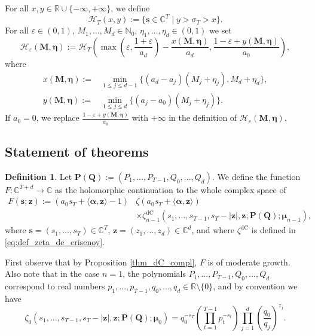 \documentclass[a4paper,12pt]{article}
\theoremstyle{definition}
\newtheorem{definition}[thm]{Definition}
\numberwithin{equation}{section}
\newcommand{\dc}{\mathrm{dC}}
\begin{document}
For all $x,y \in \mathbb{R}\cup \{ -\infty,+\infty \}$, we define
$$ \mathcal{H}_T(x,y):= \{ \mathbf{s} \in \mathbb{C}^T \mid y>\sigma_T>x \}. $$
For all $\varepsilon \in (0,1)$, $M_1,\ldots,M_d \in \mathbb{N}_0$, $\eta_1,\ldots,\eta_d \in (0,1)$ we set
$$ \mathcal{H}_{\varepsilon}(\mathbf{M},\boldsymbol{\eta}) := \mathcal{H}_T\left(\max\left(\varepsilon,\frac{1+\varepsilon}{a_d}\right)-\frac{x(\mathbf{M},\boldsymbol{\eta})}{a_d},\frac{1-\varepsilon+y(\mathbf{M},\boldsymbol{\eta})}{a_0}\right), $$
where 
\begin{align*}
    x(\mathbf{M},\boldsymbol{\eta}):=&\min_{1 \leq j \leq d-1}\{(a_d-a_j)(M_j+\eta_j),M_d+\eta_d\}, \\
    y(\mathbf{M},\boldsymbol{\eta}):=&\min_{1 \leq j \leq d}\{(a_j-a_0)(M_j+\eta_j)\}.
\end{align*}
If $a_0=0$, we replace $\frac{1-\varepsilon+y(\mathbf{M},\boldsymbol{\eta})}{a_0}$ with $+\infty$ in the definition of $\mathcal{H}_{\varepsilon}(\mathbf{M},\boldsymbol{\eta})$.

\subsection{Statement of theorems}

\begin{definition}
\label{def:F}
Let $\mathbf{P(Q)}:=(P_1,\ldots,P_{T-1},Q_0,\ldots, Q_d)$. We define the function $F:\mathbb{C}^{T+d} \to \mathbb{C}$ as the holomorphic continuation to the whole complex space of
\begin{align*}
    F(\mathbf{s};\mathbf{z}):= (a_0s_T+\langle \boldsymbol{\alpha},\mathbf{z} \rangle-1) &\zeta(a_0s_T+\langle \boldsymbol{\alpha},\mathbf{z} \rangle) \\
    & \times \zeta_{n-1}^{\dc}\left(s_1,\ldots,s_{T-1},s_T-|\mathbf{z}|,\mathbf{z}; \mathbf{P(Q)};\boldsymbol{\mu}_{n-1}\right),
\end{align*}
where $\mathbf{s}=(s_1,\ldots,s_T) \in \mathbb{C}^T$, $\mathbf{z}=(z_1,\ldots,z_d) \in \mathbb{C}^d$, and where $\zeta^{\dc}$ is defined in \eqref{eq:def_zeta_de_crisenoy}.
\end{definition}

First observe that by Proposition \ref{thm_dC_compl}, $F$ is of moderate growth. Also note that in the case $n=1$, the polynomials $P_1,\ldots,P_{T-1},Q_0,\ldots, Q_d$ correspond to real numbers $p_1,\ldots,p_{T-1},q_0,\ldots,q_d \in \mathbb{R} \setminus\{0\}$, and by convention we have
$$ \zeta_{0}(s_1,\ldots,s_{T-1},s_T-|\mathbf{z}|,\mathbf{z}; \mathbf{P(Q)};\boldsymbol{\mu}_0)=q_0^{-s_T} \left(\prod_{t=1}^{T-1} p_t^{-s_t}\right) \prod_{j=1}^d \left(\frac{q_0}{q_j}\right)^{z_j}. $$
\end{document}
